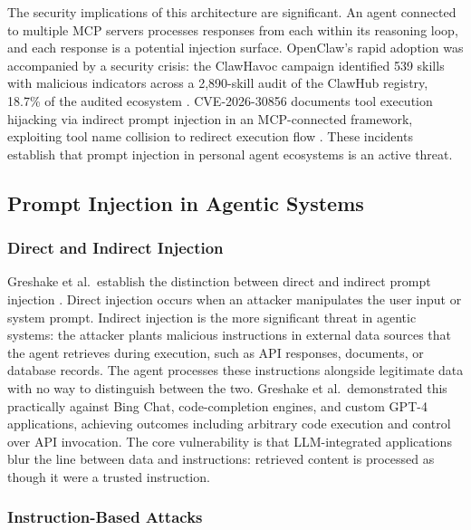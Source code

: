 \documentclass[conference]{IEEEtran}
\begin{document}
The security implications of this architecture are significant. An agent connected to
multiple MCP servers processes responses from each within its reasoning loop, and each
response is a potential injection surface. OpenClaw's rapid adoption was accompanied by a
security crisis: the ClawHavoc campaign identified 539 skills with malicious
indicators across a 2,890-skill audit of the ClawHub registry, 18.7\% of the audited
ecosystem \cite{clawhavoc_2026}. CVE-2026-30856 documents tool execution hijacking via
indirect prompt injection in an MCP-connected framework, exploiting tool name collision to
redirect execution flow \cite{cve_2026_30856}. These incidents establish that prompt
injection in personal agent ecosystems is an active threat.

\subsection{Prompt Injection in Agentic Systems}

\subsubsection{Direct and Indirect Injection}

Greshake et al.\ establish the distinction between direct and indirect prompt injection
\cite{greshake2023indirect}. Direct injection occurs when an attacker manipulates the user
input or system prompt. Indirect injection is the more significant threat in agentic
systems: the attacker plants malicious instructions in external data sources that the agent
retrieves during execution, such as API responses, documents, or database records. The
agent processes these instructions alongside legitimate data with no way to distinguish
between the two. Greshake et al.\ demonstrated this practically against Bing Chat,
code-completion engines, and custom GPT-4 applications, achieving outcomes including
arbitrary code execution and control over API invocation. The core vulnerability is that
LLM-integrated applications blur the line between data and instructions: retrieved content
is processed as though it were a trusted instruction.

\subsubsection{Instruction-Based Attacks}
\end{document}
